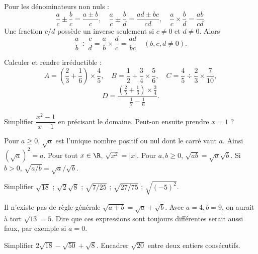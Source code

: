 \begin{keypoint}
Pour les dénominateurs non nuls :
\[\frac ac\pm\frac bc=\frac{a\pm b}{c},\quad\frac ac\pm\frac bd=\frac{ad\pm bc}{cd},\quad\frac ac\times\frac bd=\frac{ab}{cd}.\]
Une fraction $c/d$ possède un inverse seulement si $c\ne0$ et $d\ne0$. Alors
\[\frac ab\div\frac cd=\frac ab\times\frac dc=\frac{ad}{bc}\quad(b,c,d\ne0).\]
\end{keypoint}
\begin{example}Calculer et rendre irréductible :
\[A=\left(\frac23+\frac16\right)\times\frac45,\quad B=\frac12+\frac34\times\frac56,\quad C=\frac45\div\frac23\times\frac7{10},\]
\[D=\frac{\left(\frac25+\frac13\right)\times\frac34}{\frac12-\frac16}.\]\end{example}
\begin{example}Simplifier $\dfrac{x^2-1}{x-1}$ en précisant le domaine. Peut-on ensuite prendre $x=1$ ?\end{example}

\begin{keypoint}
Pour $a\geq0$, $\sqrt a$ est l'unique nombre positif ou nul dont le carré vaut $a$. Ainsi $(\sqrt a)^2=a$. Pour tout $x\in\R$, $\sqrt{x^2}=|x|$.
Pour $a,b\geq0$, $\sqrt{ab}=\sqrt a\sqrt b$. Si $b>0$, $\sqrt{a/b}=\sqrt a/\sqrt b$.
\end{keypoint}
\begin{example}Simplifier $\sqrt{18}$ ; $\sqrt2\sqrt8$ ; $\sqrt{7/25}$ ; $\sqrt{27/75}$ ; $\sqrt{(-5)^2}$.\end{example}
\begin{pitfall}Il n'existe pas de règle générale $\sqrt{a+b}=\sqrt a+\sqrt b$. Avec $a=4,b=9$, on aurait à tort $\sqrt{13}=5$. Dire que ces expressions sont toujours différentes serait aussi faux, par exemple si $a=0$.\end{pitfall}
\begin{example}Simplifier $2\sqrt{18}-\sqrt{50}+\sqrt8$. Encadrer $\sqrt{20}$ entre deux entiers consécutifs.\end{example}


